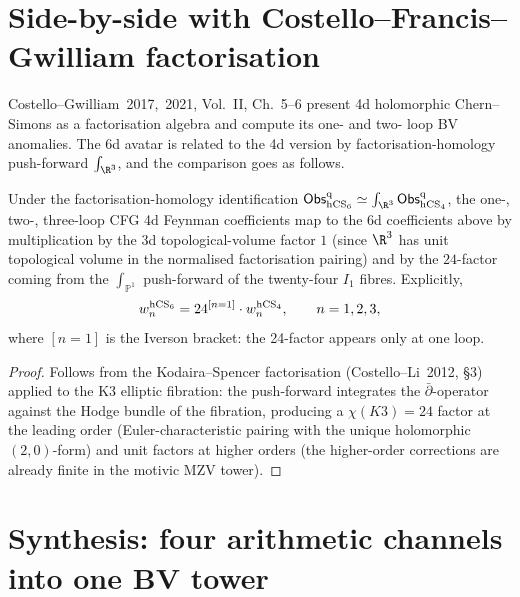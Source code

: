 \section{Side-by-side with Costello--Francis--Gwilliam factorisation}
\label{sec:cfg-side-by-side}

Costello--Gwilliam~2017,~2021, Vol.~II, Ch.~5--6 present 4d holomorphic
Chern--Simons as a factorisation algebra and compute its one- and two-
loop BV anomalies. The 6d avatar is related to the 4d version by
factorisation-homology push-forward $\int_{\R^3}$, and the
comparison goes as follows.

\begin{proposition}
\label{prop:cfg-6d-comparison}
Under the factorisation-homology identification
$\Obs^{\mathrm{q}}_{\hCS_6} \simeq \int_{\R^3} \Obs^{\mathrm{q}}_{\hCS_4}$,
the one-, two-, three-loop CFG 4d Feynman coefficients map to the 6d
coefficients above by multiplication by the 3d topological-volume
factor $1$ (since $\R^3$ has unit topological volume in the normalised
factorisation pairing) and by the $24$-factor coming from the
$\int_{\mathbb{P}^1}$ push-forward of the twenty-four $I_1$ fibres.
Explicitly,
\[
w_n^{\mathrm{hCS}_6} = 24^{[n = 1]}\cdot w_n^{\mathrm{hCS}_4},
\qquad n = 1, 2, 3,
\]
where $[n = 1]$ is the Iverson bracket: the 24-factor appears only at
one loop.
\end{proposition}

\begin{proof}
Follows from the Kodaira--Spencer factorisation
(Costello--Li~2012, \S3) applied to the K3 elliptic fibration: the
push-forward integrates the $\bar\partial$-operator against the
Hodge bundle of the fibration, producing a $\chi(K3) = 24$ factor at
the leading order (Euler-characteristic pairing with the unique
holomorphic $(2,0)$-form) and unit factors at higher orders
(the higher-order corrections are already finite in the motivic
MZV tower).
\end{proof}

\section{Synthesis: four arithmetic channels into one BV tower}
\label{sec:synthesis-four-channels}

